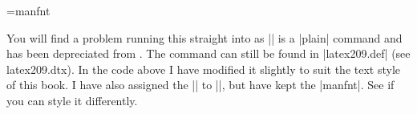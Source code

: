 \medskip
\begin{Code}
\def\hang{\hangindent3em}
\let\ninepoint\small
\font\manual=manfnt
\def\dbend{{\manual\char127}} %
\def\d@nger{\medbreak\begingroup\clubpenalty=10000
  \def\par{\endgraf\endgroup\medbreak} \noindent\hang\hangafter=-2
  \hbox to0pt{\hskip-\hangindent\dbend\hfill}\ninepoint}
\outer\def\danger{\d@nger}
\def\dd@nger{\medbreak\begingroup\clubpenalty=10000
  \def\par{\endgraf\endgroup\medbreak} \noindent\hang\hangafter=-2
  \hbox to0pt{\hskip-\hangindent\dbend\kern1pt\dbend\hfill}\ninepoint}
\outer\def\ddanger{\dd@nger}
\def\enddanger{\endgraf\endgroup} %
\end{Code}
\medbreak

You will find a problem running this straight into \latex as |\hang| is a |plain| \tex command and has been depreciated from \LaTeXe. The command can still be found in |latex209.def| (see latex209.dtx). In the code above I have modified it slightly to suit  the text style of this book. I have also assigned the |\ninepoint| to |\small|, but have kept the |manfnt|. See if you can style it differently.


\restoregeometry











